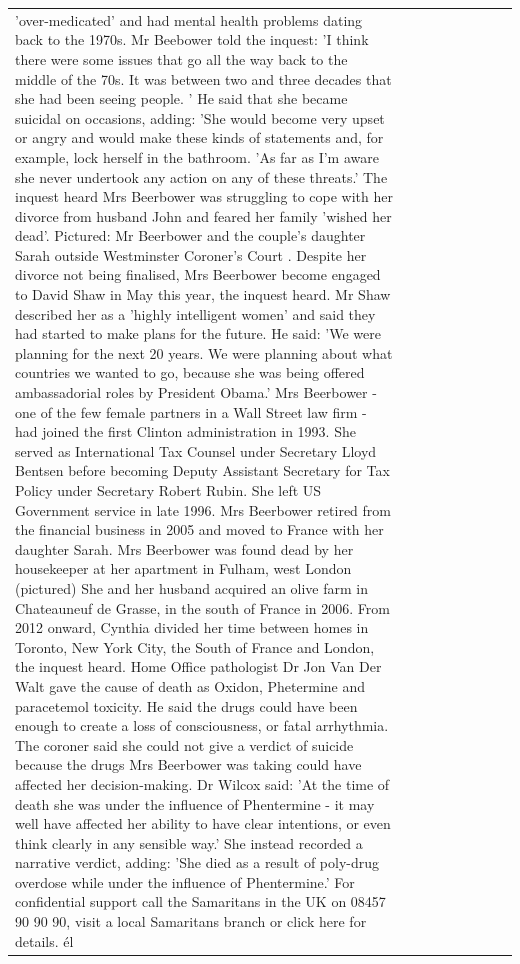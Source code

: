 \begin{table}[H]
\begin{tabular}{lllrlllll}
'over-medicated' and had mental health problems dating back to the 1970s. Mr Beebower told the inquest: 'I think there were some issues that go all the way back to the middle of the 70s. It was between two and three decades that she had been seeing people. ' He said that she became suicidal on occasions, adding: 'She would become very upset or angry and would make these kinds of statements and, for example, lock herself in the bathroom. 'As far as I'm aware she never undertook any action on any of these threats.' The inquest heard Mrs Beerbower was struggling to cope with her divorce from husband John and feared her family 'wished her dead'. Pictured: Mr Beerbower and the couple's daughter Sarah outside Westminster Coroner's Court . Despite her divorce not being finalised, Mrs Beerbower become engaged to David Shaw in May this year, the inquest heard. Mr Shaw described her as a 'highly intelligent women' and said they had started to make plans for the future. He said: 'We were planning for the next 20 years. We were planning about what countries we wanted to go, because she was being offered ambassadorial roles by President Obama.' Mrs Beerbower - one of the few female partners in a Wall Street law firm - had joined the first Clinton administration in 1993. She served as International Tax Counsel under Secretary Lloyd Bentsen before becoming Deputy Assistant Secretary for Tax Policy under Secretary Robert Rubin. She left US Government service in late 1996. Mrs Beerbower retired from the financial business in 2005 and moved to France with her daughter Sarah. Mrs Beerbower was found dead by her housekeeper at her apartment in Fulham, west London (pictured) She and her husband acquired an olive farm in Chateauneuf de Grasse, in the south of France in 2006. From 2012 onward, Cynthia divided her time between homes in Toronto, New York City, the South of France and London, the inquest heard. Home Office pathologist Dr Jon Van Der Walt gave the cause of death as Oxidon, Phetermine and paracetemol toxicity. He said the drugs could have been enough to create a loss of consciousness, or fatal arrhythmia. The coroner said she could not give a verdict of suicide because the drugs Mrs Beerbower was taking could have affected her decision-making. Dr Wilcox said: 'At the time of death she was under the influence of Phentermine - it may well have affected her ability to have clear intentions, or even think clearly in any sensible way.' She instead recorded a narrative verdict, adding: 'She died as a result of poly-drug overdose while under the influence of Phentermine.' For confidential support call the Samaritans in the UK on 08457 90 90 90, visit a local Samaritans branch or click here for details. él \\

\end{tabular}
\end{table}
